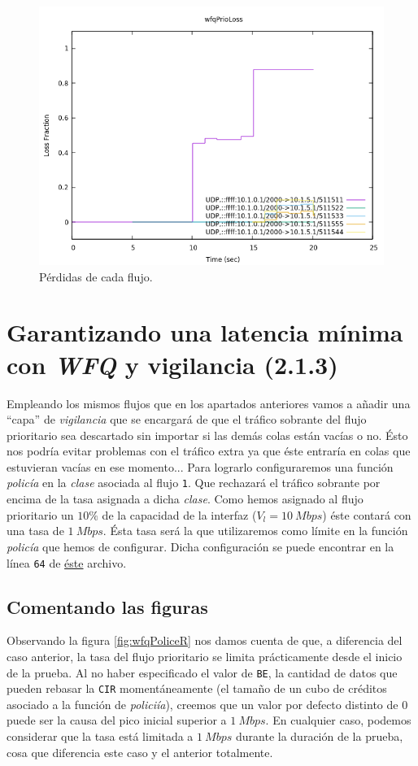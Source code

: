 \documentclass[11pt]{article}
\begin{document}
            \begin{figure}
                \centering
                \includegraphics[width=0.6\linewidth]{wfqPrioLoss.png}
                \caption{Pérdidas de cada flujo.}
                \label{fig:wfqPrioLoss}
            \end{figure}

    \section{Garantizando una latencia mínima con \textit{WFQ} y vigilancia (2.1.3)}
        Empleando los mismos flujos que en los apartados anteriores vamos a añadir una ``capa'' de \textit{vigilancia} que se encargará de que el tráfico sobrante del flujo prioritario sea descartado sin importar si las demás colas están vacías o no. Ésto nos podría evitar problemas con el tráfico extra ya que éste entraría en colas que estuvieran vacías en ese momento... Para lograrlo configuraremos una función \textit{policía} en la \textit{clase} asociada al flujo \texttt{1}. Que rechazará el tráfico sobrante por encima de la tasa asignada a dicha \textit{clase}. Como hemos asignado al flujo prioritario un $10\%$ de la capacidad de la interfaz ($V_l = 10\ Mbps$) éste contará con una tasa de $1\ Mbps$. Ésta tasa será la que utilizaremos como límite en la función \textit{policía} que hemos de configurar. Dicha configuración se puede encontrar en la línea \texttt{64} de \href{https://github.com/UAH-s-Telematics-Engineering-Tasks/traff_eng/blob/master/P2/Router_confs/policeWFQ.cfg}{éste} archivo.

        \subsection{Comentando las figuras}
            Observando la figura \ref{fig:wfqPoliceR} nos damos cuenta de que, a diferencia del caso anterior, la tasa del flujo prioritario se limita prácticamente desde el inicio de la prueba. Al no haber especificado el valor de \texttt{BE}, la cantidad de datos que pueden rebasar la \texttt{CIR} momentáneamente (el tamaño de un cubo de créditos asociado a la función de \textit{policiía}), creemos que un valor por defecto distinto de $0$ puede ser la causa del pico inicial superior a $1\ Mbps$. En cualquier caso, podemos considerar que la tasa está limitada a $1\ Mbps$ durante la duración de la prueba, cosa que diferencia este caso y el anterior totalmente.\\
\end{document}
